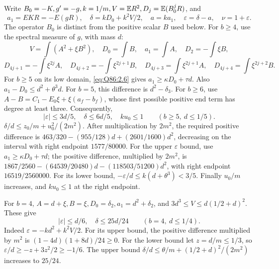 Write \(B_0=\allowbreak -K,\allowbreak g'=\allowbreak -g,\allowbreak k=\allowbreak 1/m,\allowbreak V=\allowbreak \mathbb E R^2,\allowbreak D_j=\allowbreak \mathbb E(B_0^jR)\), and
\[
a_1=EKR=-E(gR),\quad
\delta=kD_0+k^2V/2,\quad a=ka_1,\quad
\varepsilon=\delta-a,\quad\nu=1+\varepsilon.
\tag{Q86.2.9}\label{eq:Q86:2.9}
\]
The operator \(B_0\) is distinct from the positive scalar \(B\) used below.
For \(b\ge\allowbreak 4\), use the spectral measure of \(g\), with mass \(d\):
\[
V=\int(A^2+\xi B^2),\quad D_0=\int B,\quad a_1=\int A,
\quad D_2=-\int\xi B,
\]
\[
D_{4j+1}=-\int\xi^{2j}A,\quad
D_{4j+2}=-\int\xi^{2j+1}B,\quad
D_{4j+3}=\int\xi^{2j+1}A,\quad
D_{4j+4}=\int\xi^{2j+2}B.
\tag{Q86.2.10}\label{eq:Q86:2.10}
\]
For \(b\ge\allowbreak 5\) on its low domain, \eqref{eq:Q86:2.6} gives
\(a_1\ge\allowbreak \kappa D_0+\tau d\).
Also \(a_1-D_0\le\allowbreak  d^2+\theta^3d\).
For \(b=\allowbreak 5\), this difference is \(d^2-\delta_3\).
For \(b\ge\allowbreak 6\), use
\(A-B=\allowbreak C_1-E_0\xi+\xi(a_f-b_f)\), whose first possible positive end term has degree at least three.
Consequently,
\[
|\varepsilon|\le3d/5,\quad\delta\le6d/5,\quad ku_0\le1
\qquad(b\ge5,\ d\le1/5).
\tag{Q86.2.11}\label{eq:Q86:2.11}
\]
\(\delta/d\le\allowbreak  z_0/m+u_0^2/(2m^2)\).
After multiplication by \(2m^2\), the required positive difference is
\(463/320-(955/128)d+(2601/1600)d^2\), decreasing on the interval with right endpoint \(1577/80000\).
For the upper \(\varepsilon\) bound, use \(a_1\ge\allowbreak \kappa D_0+\tau d\);
the positive difference, multiplied by \(2m^2\), is
\(1867/2560-(64539/20480)d-(118503/51200)d^2\),
with right endpoint \(16519/2560000\).
For its lower bound,
\(-\varepsilon/d\le\allowbreak  k(d+\theta^3)<\allowbreak 3/5\).
Finally \(u_0/m\) increases, and \(ku_0\le\allowbreak 1\) at the right endpoint.

For \(b=\allowbreak 4\),
\(A=\allowbreak d+\xi,\allowbreak B=\allowbreak \xi,\allowbreak D_0=\allowbreak \delta_2,\allowbreak a_1=\allowbreak d^2+\delta_2\), and
\(3d^3\le\allowbreak  V\le\allowbreak  d(1/2+d)^2\). These give
\[
|\varepsilon|\le d/6,\quad\delta\le25d/24
\qquad(b=4,\ d\le1/4).
\tag{Q86.2.12}\label{eq:Q86:2.12}
\]
Indeed \(\varepsilon=\allowbreak -kd^2+k^2V/2\).
For its upper bound, the positive difference multiplied by \(m^2\) is
\((1-4d)(1+8d)/24\ge\allowbreak 0\).
For the lower bound let \(z=\allowbreak d/m\le\allowbreak 1/3\), so
\(\varepsilon/d\ge\allowbreak -z+3z^2/2\ge\allowbreak -1/6\).
The upper bound
\(\delta/d\le\allowbreak \theta/m+(1/2+d)^2/(2m^2)\) increases to \(25/24\).

